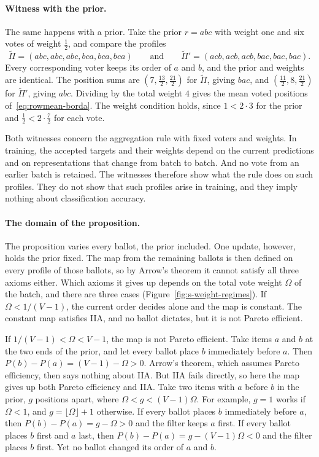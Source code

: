 \paragraph{Witness with the prior.}
The same happens with a prior. Take the prior $r=abc$ with weight one and six votes of weight $\tfrac12$, and compare the profiles
\[
\widetilde\Pi=(abc,abc,abc,bca,bca,bca)\qquad\text{and}\qquad\widetilde\Pi'=(acb,acb,acb,bac,bac,bac).
\]
Every corresponding voter keeps its order of $a$ and $b$, and the prior and weights are identical. The position sums are $(7,\tfrac{13}{2},\tfrac{21}{2})$ for $\widetilde\Pi$, giving $bac$, and $(\tfrac{11}{2},8,\tfrac{21}{2})$ for $\widetilde\Pi'$, giving $abc$. Dividing by the total weight $4$ gives the mean voted positions of~\eqref{eq:rowmean-borda}. The weight condition holds, since $1<2\cdot3$ for the prior and $\tfrac12<2\cdot\tfrac72$ for each vote.

Both witnesses concern the aggregation rule with fixed voters and weights. In training, the accepted targets and their weights depend on the current predictions and on representations that change from batch to batch. And no vote from an earlier batch is retained. The witnesses therefore show what the rule does on such profiles. They do not show that such profiles arise in training, and they imply nothing about classification accuracy.

\paragraph{The domain of the proposition.} The proposition varies every ballot, the prior included. One update, however, holds the prior fixed. The map from the remaining ballots is then defined on every profile of those ballots, so by Arrow's theorem it cannot satisfy all three axioms either. Which axioms it gives up depends on the total vote weight $\Omega$ of the batch, and there are three cases (Figure~\ref{fig:s-weight-regimes}). If $\Omega<1/(V-1)$, the current order decides alone and the map is constant. The constant map satisfies IIA, and no ballot dictates, but it is not Pareto efficient.

If $1/(V-1)<\Omega<V-1$, the map is not Pareto efficient. Take items $a$ and $b$ at the two ends of the prior, and let every ballot place $b$ immediately before $a$. Then $P(b)-P(a)=(V-1)-\Omega>0$. Arrow's theorem, which assumes Pareto efficiency, then says nothing about IIA. But IIA fails directly, so here the map gives up both Pareto efficiency and IIA. Take two items with $a$ before $b$ in the prior, $g$ positions apart, where $\Omega<g<(V-1)\Omega$. For example, $g=1$ works if $\Omega<1$, and $g=\lfloor\Omega\rfloor+1$ otherwise. If every ballot places $b$ immediately before $a$, then $P(b)-P(a)=g-\Omega>0$ and the filter keeps $a$ first. If every ballot places $b$ first and $a$ last, then $P(b)-P(a)=g-(V-1)\Omega<0$ and the filter places $b$ first. Yet no ballot changed its order of $a$ and $b$.

